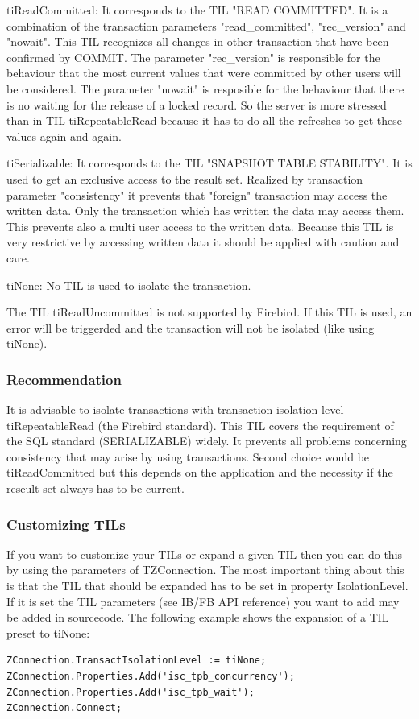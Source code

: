 \documentclass[a4paper,12pt,oneside]{book}
\begin{document}
tiReadCommitted:
It corresponds to the TIL "READ COMMITTED".
It is a combination of the transaction parameters "read\_committed", "rec\_version" and "nowait".
This TIL recognizes all changes in other transaction that have been confirmed by COMMIT.
The parameter "rec\_version" is responsible for the behaviour that the most current values that were committed by other users will be considered.
The parameter "nowait" is resposible for the behaviour that there is no waiting for the release of a locked record.
So the server is more stressed than in TIL tiRepeatableRead because it has to do all the refreshes to get these values again and again.

tiSerializable:
It corresponds to the TIL "SNAPSHOT TABLE STABILITY".
It is used to get an exclusive access to the result set.
Realized by transaction parameter "consistency" it prevents that "foreign" transaction may access the written data.
Only the transaction which has written the data may access them.
This prevents also a multi user access to the written data.
Because this TIL is very restrictive by accessing written data it should be applied with caution and care.

tiNone: No TIL is used to isolate the transaction.

The TIL tiReadUncommitted is not supported by Firebird.
If this TIL is used, an error will be triggerded and the transaction will not be isolated (like using tiNone).

\subsubsection{Recommendation}
It is advisable to isolate transactions with transaction isolation level tiRepeatableRead (the Firebird standard).
This TIL covers the requirement of the SQL standard (SERIALIZABLE) widely.
It prevents all problems concerning consistency that may arise by using transactions.
Second choice would be tiReadCommitted but this depends on the application and the necessity if the reseult set always has to be current.

\subsubsection{Customizing TILs}

If you want to customize your TILs or expand a given TIL then you can do this by using the parameters of TZConnection.
The most important thing about this is that the TIL that should be expanded has to be set in
property IsolationLevel.
If it is set the TIL parameters (see IB/FB API reference) you want to add may be added in sourcecode.
The following example shows the expansion of a TIL preset to tiNone:
\begin{verbatim}
ZConnection.TransactIsolationLevel := tiNone;
ZConnection.Properties.Add('isc_tpb_concurrency');
ZConnection.Properties.Add('isc_tpb_wait');
ZConnection.Connect;
\end{verbatim}
\end{document}

